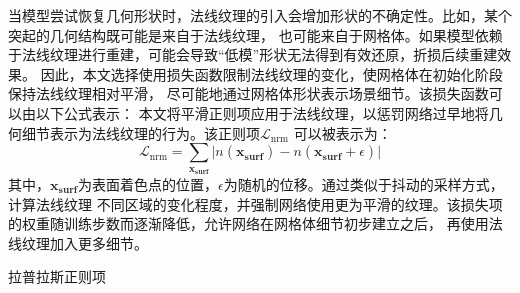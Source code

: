 当模型尝试恢复几何形状时，法线纹理的引入会增加形状的不确定性。比如，某个突起的几何结构既可能是来自于法线纹理，
也可能来自于网格体。如果模型依赖于法线纹理进行重建，可能会导致“低模”形状无法得到有效还原，折损后续重建效果。
因此，本文选择使用损失函数限制法线纹理的变化，使网格体在初始化阶段保持法线纹理相对平滑，
尽可能地通过网格体形状表示场景细节。该损失函数可以由以下公式表示：
本文将平滑正则项应用于法线纹理，以惩罚网络过早地将几何细节表示为法线纹理的行为。该正则项$\mathcal{L}_{\text{nrm}}$
可以被表示为：
\begin{equation}
  \label{eq:nrm_smooth}
  \mathcal{L}_{\text{nrm}} = \sum_{\mathbf{x_\text{surf}}} {\lvert {n({\mathbf{x_\text{surf}}})} - {n({\mathbf{x_\text{surf}}}+\epsilon)}\rvert}
\end{equation}
其中，$\mathbf{x_\text{surf}}$为表面着色点的位置，$\epsilon$为随机的位移。通过类似于抖动的采样方式，计算法线纹理
不同区域的变化程度，并强制网络使用更为平滑的纹理。该损失项的权重随训练步数而逐渐降低，允许网络在网格体细节初步建立之后，
再使用法线纹理加入更多细节。

拉普拉斯正则项

